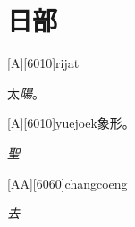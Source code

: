 
\chapter{日部}

\begin{Lemma} %
    [A][6010]{ri}{jat}\Etymology{}\pro{} \lipsum
	\begin{mainenum}
		\mitem 太\textsl{陽}。 
		\mitem  {}
		\E{\e \e \e }
		\mitem  \en{}
		\E{\e \e \e }
		\mitem  \en{}
		\E{\e \e \e }
		\mitem  \en{}
		\E{\e \e \e }
		\mitem  \en{}
		\E{\e \e \e }
		\mitem  \en{}
		\E{\e \e \e }
		\mitem  \en{}
		\E{\e \e \e }
	\end{mainenum}
\end{Lemma}

\begin{Lemma} %
	[6010]{yue}{joek}象形。
	\Etymology{}\pro{}\lipsum
	\begin{mainenum}
		\mitem \textsl{聖} \en{}
		\E{\e \e \e }
		\mitem  \en{}
		\E{\e \e \e }
		\mitem  \en{}
		\E{\e \e \e }
		\mitem  \en{}
		\E{\e \e \e }
		\mitem  \en{}
		\E{\e \e \e }
		\mitem  \en{}
		\E{\e \e \e }
	\end{mainenum}
\end{Lemma}

\begin{Lemma} %
	[AA][6060]{chang}{coeng\SP{1}}
	\Etymology{}\pro{}\lipsum
	\begin{mainenum}
		\mitem \textsl{去} \en{}
		\E{\e \e \e }
		\mitem  \en{}
		\E{\e \e \e }
		\mitem  \en{}
		\E{\e \e \e }
		\mitem  \en{}
		\E{\e \e \e }
		\mitem  \en{}
		\E{\e \e \e }
		\mitem  \en{}
		\E{\e \e \e }
	\end{mainenum}
\end{Lemma}

